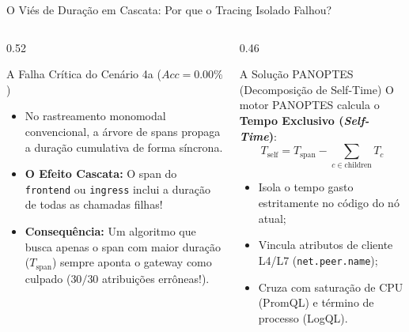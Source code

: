 \documentclass[aspectratio=169, 10pt]{beamer}
\begin{document}
\begin{frame}{O Viés de Duração em Cascata: Por que o Tracing Isolado Falhou?}
  \begin{columns}[T]
    \begin{column}{0.52\textwidth}
      \begin{alertblock}{A Falha Crítica do Cenário 4a ($Acc = 0.00\%$)}
        \begin{itemize}
          \item No rastreamento monomodal convencional, a árvore de spans propaga a duração cumulativa de forma síncrona.
          \item \textbf{O Efeito Cascata:} O span do \texttt{frontend} ou \texttt{ingress} inclui a duração de todas as chamadas filhas!
          \item \textbf{Consequência:} Um algoritmo que busca apenas o span com maior duração ($T_{\text{span}}$) sempre aponta o gateway como culpado ($30/30$ atribuições errôneas!).
        \end{itemize}
      \end{alertblock}
    \end{column}
    
    \begin{column}{0.46\textwidth}
      \begin{exampleblock}{A Solução PANOPTES (Decomposição de Self-Time)}
        O motor PANOPTES calcula o \textbf{Tempo Exclusivo (\textit{Self-Time})}:
        \begin{equation*}
          T_{\text{self}} = T_{\text{span}} - \sum_{c \in \text{children}} T_c
        \end{equation*}
        \begin{itemize}
          \item Isola o tempo gasto estritamente no código do nó atual;
          \item Vincula atributos de cliente L4/L7 (\texttt{net.peer.name});
          \item Cruza com saturação de CPU (PromQL) e término de processo (LogQL).
        \end{itemize}
      \end{exampleblock}
    \end{column}
  \end{columns}
\end{frame}

\end{document}
